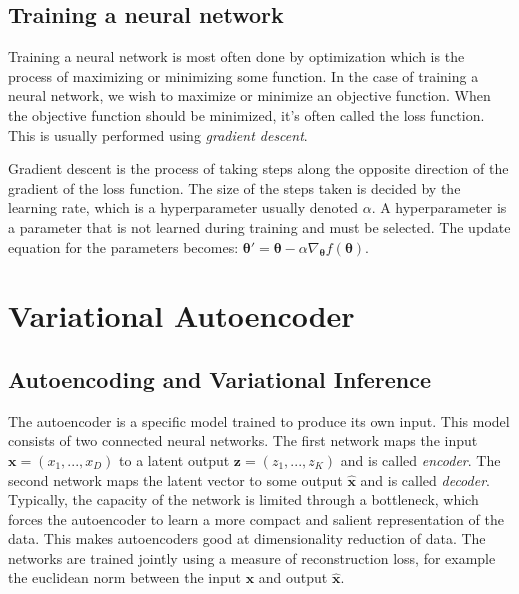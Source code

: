 \documentclass{kththesis}
\newcommand{\vz}{\boldsymbol{z}}
\newcommand{\vx}{\boldsymbol{x}}
\newcommand{\vth}{\boldsymbol{\theta}}
\begin{document}
\subsection{Training a neural network}

Training a neural network is most often done by optimization \parencite{Goodfellow-et-al-2016} which is the process of maximizing or minimizing some function. In the case of training a neural network, we wish to maximize or minimize an objective function. When the objective function should be minimized, it's often called the loss function. This is usually performed using \textit{gradient descent}.

Gradient descent is the process of taking steps along the opposite direction of the gradient of the loss function. The size of the steps taken is decided by the learning rate, which is a hyperparameter usually denoted $\alpha$. A hyperparameter is a parameter that is not learned during training and must be selected. The update equation for the parameters becomes: $\vth' = \vth - \alpha \nabla_{\vth} f(\vth)$. 

\section{Variational Autoencoder}

\subsection{Autoencoding and Variational Inference}

The autoencoder is a specific model trained to produce its own input. This model consists of two connected neural networks. The first network maps the input $\vx = (x_1, ..., x_D)$ to a latent output $\vz = (z_1, ..., z_K)$ and is called \emph{encoder}. The second network maps the latent vector to some output $\hat{\vx}$ and is called \emph{decoder}. Typically, the capacity of the network is limited through a bottleneck, which forces the autoencoder to learn a more compact and salient representation of the data. This makes autoencoders good at dimensionality reduction of data. The networks are trained jointly using a measure of reconstruction loss, for example the euclidean norm between the input $\vx$ and output $\hat{\vx}$.


\end{document}
